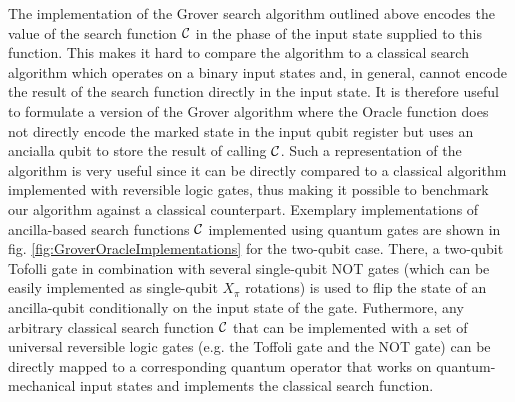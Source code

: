 The implementation of the Grover search algorithm outlined above encodes the value of the search function $\Or$ in the phase of the input state supplied to this function. This makes it hard to compare the algorithm to a classical search algorithm which operates on a binary input states and, in general, cannot encode the result of the search function directly in the input state. It is therefore useful to formulate a version of the Grover algorithm where the Oracle function does not directly encode the marked state in the input qubit register but uses an ancialla qubit to store the result of calling $\Or$. Such a representation of the algorithm is very useful since it can be directly compared to a classical algorithm implemented with reversible logic gates, thus making it possible to benchmark our algorithm against a classical counterpart. Exemplary implementations of ancilla-based search functions $\Or$ implemented using quantum gates are shown in fig. \ref{fig:GroverOracleImplementations} for the two-qubit case. There, a two-qubit Tofolli gate in combination with several single-qubit NOT gates (which can be easily implemented as single-qubit $X_{\pi}$ rotations) is used to flip the state of an ancilla-qubit conditionally on the input state of the gate. Futhermore, any arbitrary classical search function $\Or$ that can be implemented with a set of universal reversible logic gates (e.g. the Toffoli gate and the NOT gate) can be directly mapped to a corresponding quantum operator that works on quantum-mechanical input states and implements the classical search function.

